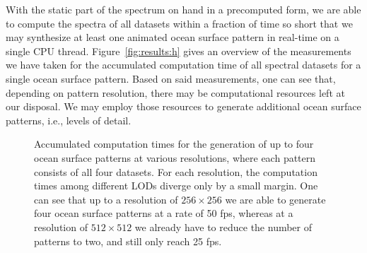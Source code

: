 With the static part of the spectrum on hand in a precomputed form, we are able
to compute the spectra of all datasets within a fraction of time so short that
we may synthesize at least one animated ocean surface pattern in real-time on
a single CPU thread.
Figure~\ref{fig:results:h} gives an overview of the measurements we have taken
for the accumulated computation time of all spectral datasets for a single
ocean surface pattern. Based on said measurements, one can see that, depending
on pattern resolution, there may be computational resources left at our
disposal.
We may employ those resources to generate additional ocean surface patterns,
i.e., levels of detail.
%
\begin{figure}
\centering
\mydata
{}
\caption{Accumulated computation times for the generation of up to four
ocean surface patterns at various resolutions, where each pattern consists of
all four datasets.
For each resolution, the computation times among different LODs diverge only
by a small margin.
One can see that up to a resolution of $256 \times 256$ we are able to generate
four ocean surface patterns at a rate of 50 fps, whereas at a resolution of
$512 \times 512$ we already have to reduce the number of patterns to two, and
still only reach 25 fps.
}
\label{fig:results:lods}
\end{figure}
%


